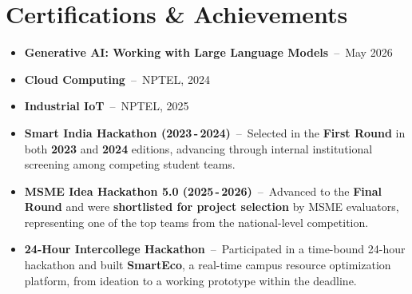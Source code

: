 \documentclass[a4paper,11pt]{article}
\begin{document}
\section{Certifications \& Achievements}
{\small
\begin{itemize}[nosep, leftmargin=1em, itemsep=1pt]

  \item \textbf{Generative AI: Working with Large Language Models} \,--\, May 2026
  \item \textbf{Cloud Computing} \,--\, NPTEL, 2024
  \item \textbf{Industrial IoT} \,--\, NPTEL, 2025

  \item \textbf{Smart India Hackathon (2023\,-\,2024)} \,--\, Selected in the \textbf{First Round}
        in both \textbf{2023} and \textbf{2024} editions, advancing through internal
        institutional screening among competing student teams.

  \item \textbf{MSME Idea Hackathon 5.0 (2025\,-\,2026)} \,--\, Advanced to the
        \textbf{Final Round} and were \textbf{shortlisted for project selection} by
        MSME evaluators, representing one of the top teams from the national-level competition.

  \item \textbf{24-Hour Intercollege Hackathon} \,--\, Participated in a time-bound
        24-hour hackathon and built \textbf{SmartEco}, a real-time campus resource
        optimization platform, from ideation to a working prototype within the
        deadline.

\end{itemize}
}
\end{document}
